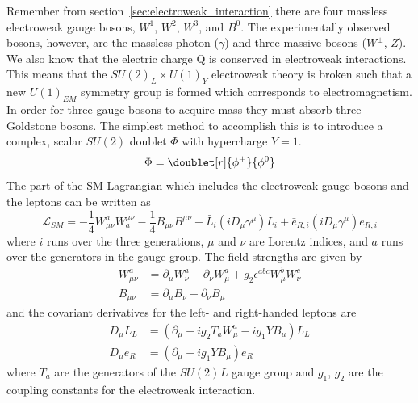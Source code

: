 Remember from section~\ref{sec:electroweak_interaction} there are four massless electroweak gauge bosons, $W^{1}$, $W^{2}$, $W^{3}$, and $B^{0}$.
The experimentally observed bosons, however, are the massless photon ($\gamma$) and three massive bosons ($W^{\pm}$, $Z$).
We also know that the electric charge Q is conserved in electroweak interactions.
This means that the $SU\left(2\right)_{L}{\times}U\left(1\right)_{Y}$ electroweak theory is broken such that a new $U\left(1\right)_{EM}$ symmetry group is formed which corresponds to electromagnetism.
In order for three gauge bosons to acquire mass they must absorb three Goldstone bosons.
The simplest method to accomplish this is to introduce a complex, scalar $SU\left(2\right)$ doublet $\Phi$ with hypercharge $Y=1$.
\begin{equation}\label{eq:higgs_scalar_field}
	\Phi=\doublet[r]{\phi^{+}}{\phi^{0}}
\end{equation}
The part of the SM Lagrangian which includes the electroweak gauge bosons and the leptons can be written as
\begin{equation}
	\mathcal{L}_{SM}=-\frac{1}{4}W_{\mu\nu}^{a}W_{a}^{\mu\nu}-\frac{1}{4}B_{\mu\nu}B^{\mu\nu}+\bar{L}_{i}\left(iD_{\mu}\gamma^{\mu}\right)L_{i}+\bar{e}_{R,i}\left(iD_{\mu}\gamma^{\mu}\right)e_{R,i}
\end{equation}
where $i$ runs over the three generations, $\mu$ and $\nu$ are Lorentz indices, and $a$ runs over the generators in the gauge group.
The field strengths are given by
\begin{align}
	W_{\mu\nu}^{a}&=\partial_{\mu}W_{\nu}^{a}-\partial_{\nu}W_{\mu}^{a}+g_{2}\epsilon^{abc}W_{\mu}^{b}W_{\nu}^{c}\\
	B_{\mu\nu}&=\partial_{\mu}B_{\nu}-\partial_{\nu}B_{\mu}
\end{align}
and the covariant derivatives for the left- and right-handed leptons are
\begin{align}
	D_{\mu}L_{L}&=\left(\partial_{\mu}-ig_{2}T_{a}W_{\mu}^{a}-ig_{1}YB_{\mu}\right)L_{L}\\
	D_{\mu}e_{R}&=\left(\partial_{\mu}-ig_{1}YB_{\mu}\right)e_{R}
\end{align}
where $T_{a}$ are the generators of the $SU\left(2\right)_{}L$ gauge group and $g_{1}$, $g_{2}$ are the coupling constants for the electroweak interaction.

